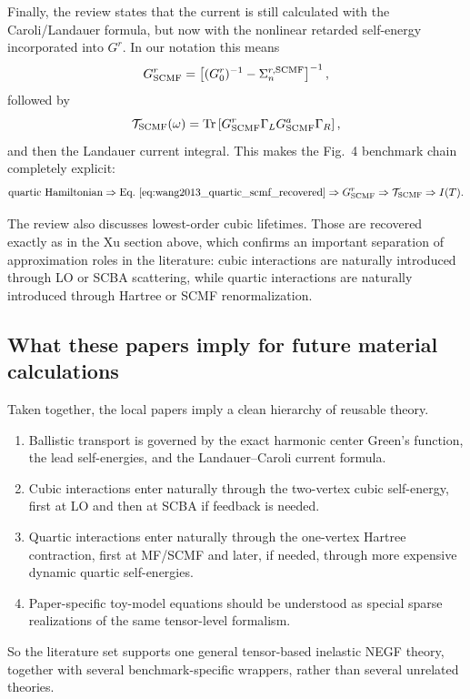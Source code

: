 Finally, the review states that the current is still calculated with the Caroli/Landauer formula, but now with the nonlinear retarded self-energy incorporated into $G^r$. In our notation this means
\begin{equation}
    G^r_{\rm SCMF}
    =
    \left[ (G_0^r)^{-1} - \Sigma_n^{r,\rm SCMF} \right]^{-1},
    \label{eq:wang2013_scmf_dressed_green}
\end{equation}
followed by
\begin{equation}
    \mathcal T_{\rm SCMF}(\omega)
    =
    \operatorname{Tr}\left[ G_{\rm SCMF}^r\Gamma_L G_{\rm SCMF}^a\Gamma_R \right],
    \label{eq:wang2013_scmf_caroli}
\end{equation}
and then the Landauer current integral. This makes the Fig.~4 benchmark chain completely explicit:
\begin{equation}
    \text{quartic Hamiltonian}
    \Rightarrow
    \text{Eq.~\eqref{eq:wang2013_quartic_scmf_recovered}}
    \Rightarrow
    G_{\rm SCMF}^r
    \Rightarrow
    \mathcal T_{\rm SCMF}
    \Rightarrow
    I(T).
    \label{eq:wang2013_fig4_benchmark_chain}
\end{equation}

The review also discusses lowest-order cubic lifetimes. Those are recovered exactly as in the Xu section above, which confirms an important separation of approximation roles in the literature: cubic interactions are naturally introduced through LO or SCBA scattering, while quartic interactions are naturally introduced through Hartree or SCMF renormalization.

\subsection{What these papers imply for future material calculations}
Taken together, the local papers imply a clean hierarchy of reusable theory.
\begin{enumerate}[label=\arabic*.]
\item Ballistic transport is governed by the exact harmonic center Green's function, the lead self-energies, and the Landauer--Caroli current formula.
\item Cubic interactions enter naturally through the two-vertex cubic self-energy, first at LO and then at SCBA if feedback is needed.
\item Quartic interactions enter naturally through the one-vertex Hartree contraction, first at MF/SCMF and later, if needed, through more expensive dynamic quartic self-energies.
\item Paper-specific toy-model equations should be understood as special sparse realizations of the same tensor-level formalism.
\end{enumerate}
So the literature set supports one general tensor-based inelastic NEGF theory, together with several benchmark-specific wrappers, rather than several unrelated theories.

